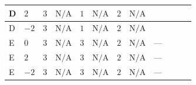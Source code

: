 \documentclass[8pt]{article}
\begin{document}
\begin{landscape}
\begin{longtable}{@{}llcccccc >{\raggedright\arraybackslash}p{0.21\linewidth} >{\raggedright\arraybackslash}p{0.21\linewidth} >{\raggedright\arraybackslash}p{0.21\linewidth}@{}}
\midrule
D & $2$ & $3$ & $\text{N/A}$ & $1$ & $\text{N/A}$ & $2$ & $\text{N/A}$ & \scriptsize\adjustbox{max width=\linewidth}{$\begin{gathered} +6 {\lambda_{12}^{(1)}} {\lambda_{HS_1}^{(1)}}\end{gathered}$} & \scriptsize\adjustbox{max width=\linewidth}{$\begin{gathered} +6 {\lambda_1} {\lambda_{HS_2}^{(1)}}\end{gathered}$} & \scriptsize\adjustbox{max width=\linewidth}{$\begin{gathered} +4 {\lambda_{HS_2}^{(1)}}^2\end{gathered}$} \\
\midrule
D & $-2$ & $3$ & $\text{N/A}$ & $1$ & $\text{N/A}$ & $2$ & $\text{N/A}$ & \scriptsize\adjustbox{max width=\linewidth}{$\begin{gathered} +6 {\lambda_{12}^{(1)}} {\lambda_{HS_1}^{(1)}}\end{gathered}$} & \scriptsize\adjustbox{max width=\linewidth}{$\begin{gathered} +6 {\lambda_1} {\lambda_{HS_2}^{(1)}}\end{gathered}$} & \scriptsize\adjustbox{max width=\linewidth}{$\begin{gathered} +4 {\lambda_{HS_2}^{(1)}}^2\end{gathered}$} \\
\midrule
E & $0$ & $3$ & $\text{N/A}$ & $3$ & $\text{N/A}$ & $2$ & $\text{N/A}$ & --- & \scriptsize\adjustbox{max width=\linewidth}{$\begin{gathered} +6 {\lambda_1} {\lambda_{HS_2}^{(1)}}\end{gathered}$} & \scriptsize\adjustbox{max width=\linewidth}{$\begin{gathered} +4 {\lambda_{HS_2}^{(1)}}^2\end{gathered}$} \\
\midrule
E & $2$ & $3$ & $\text{N/A}$ & $3$ & $\text{N/A}$ & $2$ & $\text{N/A}$ & --- & \scriptsize\adjustbox{max width=\linewidth}{$\begin{gathered} +6 {\lambda_1} {\lambda_{HS_2}^{(1)}}\end{gathered}$} & \scriptsize\adjustbox{max width=\linewidth}{$\begin{gathered} +4 {\lambda_{HS_2}^{(1)}}^2\end{gathered}$} \\
\midrule
E & $-2$ & $3$ & $\text{N/A}$ & $3$ & $\text{N/A}$ & $2$ & $\text{N/A}$ & --- & \scriptsize\adjustbox{max width=\linewidth}{$\begin{gathered} +6 {\lambda_1} {\lambda_{HS_2}^{(1)}}\end{gathered}$} & \scriptsize\adjustbox{max width=\linewidth}{$\begin{gathered} +4 {\lambda_{HS_2}^{(1)}}^2\end{gathered}$} \\

\end{longtable}
\end{landscape}
\end{document}

